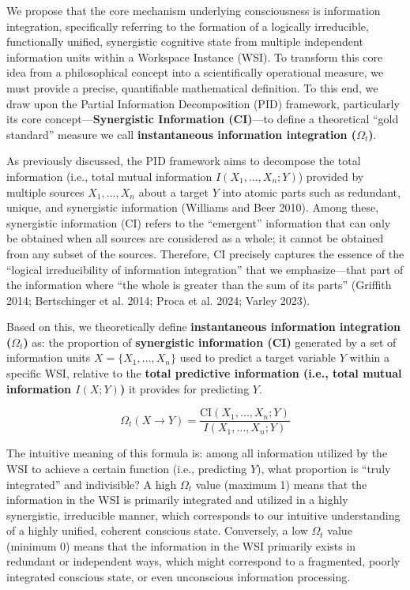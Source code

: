 \documentclass[
  a4paper]{article}
\begin{document}
We propose that the core mechanism underlying consciousness is
information integration, specifically referring to the formation of a
logically irreducible, functionally unified, synergistic cognitive state
from multiple independent information units within a Workspace Instance
(WSI). To transform this core idea from a philosophical concept into a
scientifically operational measure, we must provide a precise,
quantifiable mathematical definition. To this end, we draw upon the
Partial Information Decomposition (PID) framework, particularly its core
concept---\textbf{Synergistic Information (CI)}---to define a
theoretical ``gold standard'' measure we call \textbf{instantaneous
information integration (\(\Omega_t\))}.

As previously discussed, the PID framework aims to decompose the total
information (i.e., total mutual information \(I(X_1, ..., X_n; Y)\))
provided by multiple sources \(X_1, ..., X_n\) about a target \(Y\) into
atomic parts such as redundant, unique, and synergistic information
(Williams and Beer 2010). Among these, synergistic information (CI)
refers to the ``emergent'' information that can only be obtained when
all sources are considered as a whole; it cannot be obtained from any
subset of the sources. Therefore, CI precisely captures the essence of
the ``logical irreducibility of information integration'' that we
emphasize---that part of the information where ``the whole is greater
than the sum of its parts'' (Griffith 2014; Bertschinger et al. 2014;
Proca et al. 2024; Varley 2023).

Based on this, we theoretically define \textbf{instantaneous information
integration (\(\Omega_t\))} as: the proportion of \textbf{synergistic
information (CI)} generated by a set of information units
\(X = \{X_1, ..., X_n\}\) used to predict a target variable \(Y\) within
a specific WSI, relative to the \textbf{total predictive information
(i.e., total mutual information \(I(X;Y)\))} it provides for predicting
\(Y\).

\[
\Omega_t(X \to Y) = \frac{\mathrm{CI}(X_1, \ldots, X_n; Y)}{I(X_1, \ldots, X_n; Y)}
\]

The intuitive meaning of this formula is: among all information utilized
by the WSI to achieve a certain function (i.e., predicting \(Y\)), what
proportion is ``truly integrated'' and indivisible? A high \(\Omega_t\)
value (maximum 1) means that the information in the WSI is primarily
integrated and utilized in a highly synergistic, irreducible manner,
which corresponds to our intuitive understanding of a highly unified,
coherent conscious state. Conversely, a low \(\Omega_t\) value (minimum
0) means that the information in the WSI primarily exists in redundant
or independent ways, which might correspond to a fragmented, poorly
integrated conscious state, or even unconscious information processing.
\end{document}
